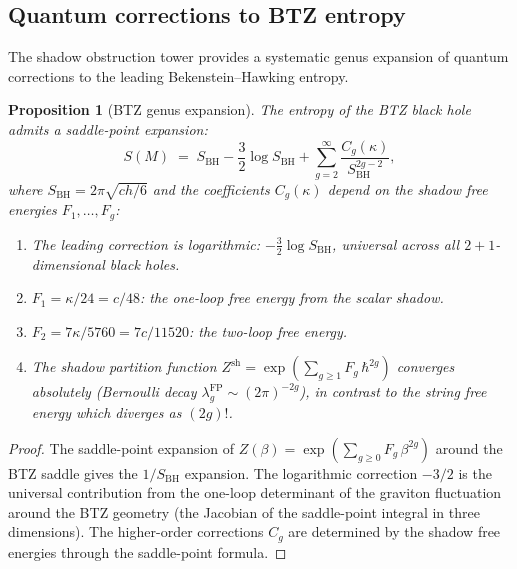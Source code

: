 \documentclass[11pt,reqno]{amsart}
\newtheorem{proposition}[theorem]{Proposition}
\theoremstyle{definition}
\theoremstyle{remark}
\begin{document}
\subsection{Quantum corrections to BTZ entropy}

The shadow obstruction tower provides a systematic genus expansion
of quantum corrections to the leading Bekenstein--Hawking entropy.

\begin{proposition}[BTZ genus expansion]
\label{prop:btz-genus}
The entropy of the BTZ black hole admits a saddle-point expansion:
\begin{equation}\label{eq:btz-genus-expansion}
S(M)
\;=\;
S_{\mathrm{BH}}
- \frac{3}{2}\log S_{\mathrm{BH}}
+ \sum_{g=2}^{\infty}
\frac{C_g(\kappa)}{S_{\mathrm{BH}}^{2g-2}},
\end{equation}
where $S_{\mathrm{BH}} = 2\pi\sqrt{ch/6}$ and the coefficients
$C_g(\kappa)$ depend on the shadow free energies
$F_1, \ldots, F_g$:
\begin{enumerate}[label=\textup{(\roman*)}]
\item The leading correction is logarithmic:
  $-\frac{3}{2}\log S_{\mathrm{BH}}$, universal across all
  $2{+}1$-dimensional black holes.
\item $F_1 = \kappa/24 = c/48$:
  the one-loop free energy from the scalar shadow.
\item $F_2 = 7\kappa/5760 = 7c/11520$:
  the two-loop free energy.
\item The shadow partition function
  $Z^{\mathrm{sh}} = \exp(\sum_{g \ge 1} F_g\,\hbar^{2g})$
  converges absolutely (Bernoulli decay
  $\lambda_g^{\mathrm{FP}} \sim (2\pi)^{-2g}$),
  in contrast to the string free energy
  which diverges as $(2g)!$.
\end{enumerate}
\end{proposition}

\begin{proof}
The saddle-point expansion of $Z(\beta)
= \exp(\sum_{g \ge 0} F_g\,\beta^{2g})$
around the BTZ saddle gives the $1/S_{\mathrm{BH}}$ expansion.
The logarithmic correction $-3/2$ is the universal contribution
from the one-loop determinant of the graviton fluctuation around
the BTZ geometry (the Jacobian of the saddle-point integral
in three dimensions). The higher-order corrections $C_g$ are
determined by the shadow free energies through the
saddle-point formula.
\end{proof}
\end{document}
